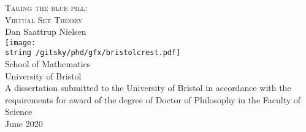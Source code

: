 \documentclass[../main]{subfiles}
\begin{document}
\begin{titlepage}
  \begin{center}
	  \vspace*{0.5cm}
    {\huge\textsc{Taking the blue pill:}}\\[0.4cm]
    {\Huge\textsc{Virtual Set Theory}}\\[0.4cm]
    {\LARGE Dan Saattrup Nielsen}\\[3.0cm]
    \texttt{[image: \\string~/gitsky/phd/gfx/bristolcrest.pdf]}\\
	  \vspace*{0.5cm}
    {\Large School of Mathematics}\\[0.2cm]
    {\Large\sc University of Bristol}\\[0.6cm]
	  \vspace*{\fill}
    {\large A dissertation submitted to the University of Bristol in accordance with the requirements for award of the degree of Doctor of Philosophy in the Faculty of Science}\\[0.5cm]
    {\large\sc June 2020}
  \end{center}
\end{titlepage}

\noindent
\pagestyle{fancy}
\fancyhead[L]{\nouppercase\leftmark}
\fancyhead[R]{\nouppercase\rightmark}
\setlength\headsep{35pt}

\thispagestyle{empty}
\end{document}

